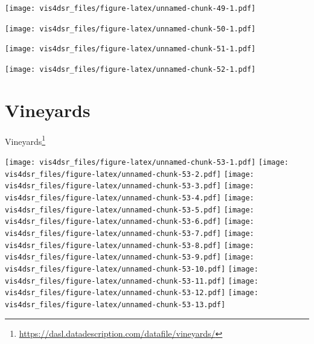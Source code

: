 \documentclass[
]{krantz}
\renewcommand{\href}[2]{#2\footnote{\url{#1}}}
\begin{document}
\texttt{[image: vis4dsr\_files/figure-latex/unnamed-chunk-49-1.pdf]}

\texttt{[image: vis4dsr\_files/figure-latex/unnamed-chunk-50-1.pdf]}

\texttt{[image: vis4dsr\_files/figure-latex/unnamed-chunk-51-1.pdf]}

\texttt{[image: vis4dsr\_files/figure-latex/unnamed-chunk-52-1.pdf]}

\hypertarget{vineyards}{%
\section*{Vineyards}\label{vineyards}}


\href{https://dasl.datadescription.com/datafile/vineyards/}{Vineyards}

\texttt{[image: vis4dsr\_files/figure-latex/unnamed-chunk-53-1.pdf]} \texttt{[image: vis4dsr\_files/figure-latex/unnamed-chunk-53-2.pdf]} \texttt{[image: vis4dsr\_files/figure-latex/unnamed-chunk-53-3.pdf]} \texttt{[image: vis4dsr\_files/figure-latex/unnamed-chunk-53-4.pdf]} \texttt{[image: vis4dsr\_files/figure-latex/unnamed-chunk-53-5.pdf]} \texttt{[image: vis4dsr\_files/figure-latex/unnamed-chunk-53-6.pdf]} \texttt{[image: vis4dsr\_files/figure-latex/unnamed-chunk-53-7.pdf]} \texttt{[image: vis4dsr\_files/figure-latex/unnamed-chunk-53-8.pdf]} \texttt{[image: vis4dsr\_files/figure-latex/unnamed-chunk-53-9.pdf]} \texttt{[image: vis4dsr\_files/figure-latex/unnamed-chunk-53-10.pdf]} \texttt{[image: vis4dsr\_files/figure-latex/unnamed-chunk-53-11.pdf]} \texttt{[image: vis4dsr\_files/figure-latex/unnamed-chunk-53-12.pdf]} \texttt{[image: vis4dsr\_files/figure-latex/unnamed-chunk-53-13.pdf]}

  

\backmatter
\printindex
\end{document}
